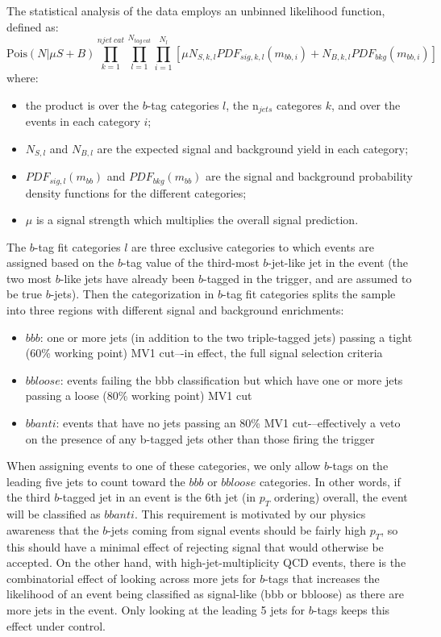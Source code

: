 The statistical analysis of the data employs an unbinned likelihood
function, defined as:
\begin{equation}
\text{Pois}(N|\mu S+B) \prod_{k=1}^{njet\ cat} \prod_{l=1}^{N_{tag\ cat}} \prod_{i=1}^{N_{l}} \left[ \mu N_{S,k,l} PDF_{sig,k,l}(m_{bb,i}) + N_{B,k,l} PDF_{bkg}(m_{bb,i}) \right]
\end{equation}
where:
\begin{itemize}
\item the product is over the $b$-tag categories $l$, the n$_{jets}$ categores $k$, and over the events in each category $i$;
\item $N_{S,l}$ and $N_{B,l}$ are the expected signal and background yield in each category;
\item $PDF_{sig,l}(m_{bb})$ and $PDF_{bkg}(m_{bb})$ are the signal and background probability density functions for  the different categories;
\item $\mu$ is a signal strength which multiplies the overall signal prediction.
\end{itemize}


The $b$-tag fit categories $l$ are three exclusive categories to which events are assigned
based on the $b$-tag value of the third-most $b$-jet-like jet in the event (the two most
$b$-like jets have already been $b$-tagged in the trigger, and are assumed to be true
$b$-jets).  Then the categorization in $b$-tag fit categories splits the sample into three
regions with different signal and background enrichments:


\begin{itemize}
    \item $bbb$: one or more jets (in addition to the two triple-tagged jets) passing a tight (60\% working point)
 MV1 cut–-in effect, the full signal selection criteria
    \item $bbloose$: events failing the bbb classification but which have one or more jets passing a loose (80\%
working point) MV1 cut
    \item $bbanti$: events that have no jets passing an 80\% MV1 cut-–effectively a veto on the presence of any
b-tagged jets other than those firing the trigger
\end{itemize}

When assigning events to one of these categories, we only allow $b$-tags on the leading
five jets to count toward the $bbb$ or $bbloose$ categories.  In other words, if the third
$b$-tagged jet in an event is the 6th jet (in $p_T$ ordering) overall, the event 
will be classified as $bbanti$.  This requirement is motivated by our physics awareness that
the $b$-jets coming from signal events should be fairly high $p_T$, so this should have
a minimal effect of rejecting signal that would otherwise be accepted.  On the other
hand, with high-jet-multiplicity QCD events, there is the combinatorial effect of looking across
more jets for $b$-tags that increases the likelihood of an event being classified as signal-like
(bbb or bbloose) as there are more jets in the event.  Only looking at the leading 5 jets
for $b$-tags keeps this effect under control. 


